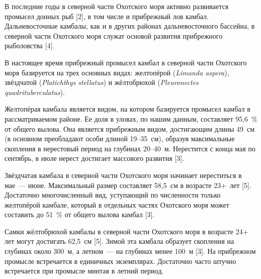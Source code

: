 



\makeProcTitleIVRazdel
{}



В последние годы в северной части Охотского моря активно развивается промысел донных рыб [2], в том числе и прибрежный лов камбал. Дальневосточные камбалы, как и в других районах дальневосточного бассейна, в северной части Охотского моря служат основой развития прибрежного рыболовства [4].

В настоящее время прибрежный промысел камбал в северной части Охотского моря базируется на трех основных видах: желтопёрой (\textit{Limanda aspera}), звёздчатой (\textit{Platichthys stellatus}) и жёлтобрюхой (\textit{Pleuronectes quad\-ri\-tu\-ber\-culatus}).

Желтопёрая камбала является видом, на котором базируется промысел камбал в рассматриваемом районе. Ее доля в уловах, по нашим данным, составляет 95,6~\% от общего вылова. Она является прибрежным видом, достигающим длины 49~см (в основном преобладают особи длиной 19--35~см), образуя максимальные скопления в нерестовый период на глубинах 20--40~м. Нерестится с конца мая по сентябрь, в июле нерест достигает массового развития [3].

Звёздчатая камбала в северной части Охотского моря начинает нереститься в мае~--- июне. Максимальный размер составляет 58,5~см в возрасте 23+~лет [5]. Достаточно многочисленный вид, уступающий по численности только желтопёрой камбале, который в отдельных частях Охотского моря может составить до 51~\% от общего вылова камбал [3].

Самки жёлтобрюхой камбалы в северной части Охотского моря в возрасте 24+ лет могут достигать 62,5~см [5]. Зимой эта камбала образует скопления на глубинах около 300~м, а летном~--- на глубинах менее 100~м [3]. На прибрежном промысле встречается в единичных экземплярах. Достаточно часто штучно встречается при промысле минтая в летний период.

